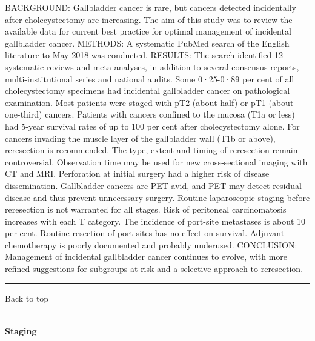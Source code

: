 \documentclass[]{article}
\let\oldparagraph\paragraph
\renewcommand{\paragraph}[1]{\oldparagraph{#1}\mbox{}}
\begin{document}
BACKGROUND: Gallbladder cancer is rare, but cancers detected
incidentally after cholecystectomy are increasing. The aim of this study
was to review the available data for current best practice for optimal
management of incidental gallbladder cancer. METHODS: A systematic
PubMed search of the English literature to May 2018 was conducted.
RESULTS: The search identified 12 systematic reviews and meta-analyses,
in addition to several consensus reports, multi-institutional series and
national audits. Some 0·25-0·89 per cent of all cholecystectomy
specimens had incidental gallbladder cancer on pathological examination.
Most patients were staged with pT2 (about half) or pT1 (about one-third)
cancers. Patients with cancers confined to the mucosa (T1a or less) had
5-year survival rates of up to 100 per cent after cholecystectomy alone.
For cancers invading the muscle layer of the gallbladder wall (T1b or
above), reresection is recommended. The type, extent and timing of
reresection remain controversial. Observation time may be used for new
cross-sectional imaging with CT and MRI. Perforation at initial surgery
had a higher risk of disease dissemination. Gallbladder cancers are
PET-avid, and PET may detect residual disease and thus prevent
unnecessary surgery. Routine laparoscopic staging before reresection is
not warranted for all stages. Risk of peritoneal carcinomatosis
increases with each T category. The incidence of port-site metastases is
about 10 per cent. Routine resection of port sites has no effect on
survival. Adjuvant chemotherapy is poorly documented and probably
underused. CONCLUSION: Management of incidental gallbladder cancer
continues to evolve, with more refined suggestions for subgroups at risk
and a selective approach to reresection.

{}

{}

\begin{center}\rule{0.5\linewidth}{\linethickness}\end{center}

Back to top

\begin{center}\rule{0.5\linewidth}{\linethickness}\end{center}

\pagebreak

\hypertarget{staging-2}{%
\paragraph{Staging}\label{staging-2}}
\end{document}
